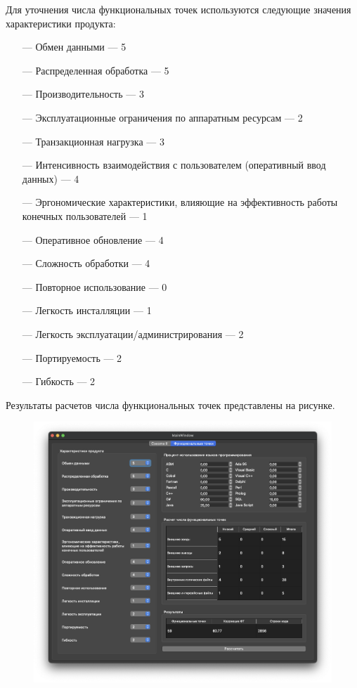 Для уточнения числа функциональных точек используются следующие значения характеристики продукта:

\begin{itemize}
    \item[---] Обмен данными --- 5
    \item[---] Распределенная обработка --- 5
    \item[---] Производительность --- 3
    \item[---] Эксплуатационные ограничения по аппаратным ресурсам --- 2
    \item[---] Транзакционная нагрузка --- 3
    \item[---] Интенсивность взаимодействия с пользователем (оперативный ввод данных) --- 4
    \item[---] Эргономические характеристики, влияющие на эффективность работы конечных пользователей --- 1
    \item[---] Оперативное обновление --- 4
    \item[---] Сложность обработки --- 4
    \item[---] Повторное использование --- 0
    \item[---] Легкость инсталляции --- 1
    \item[---] Легкость эксплуатации/администрирования --- 2
    \item[---] Портируемость --- 2
    \item[---] Гибкость --- 2 
\end{itemize}

Результаты расчетов числа функциональных точек представлены на рисунке.

\begin{figure}[h!]
	\begin{center}
		\includegraphics[scale=0.45]{inc/img/p_2.png}
	\end{center}
	\captionsetup{justification=centering}
	\label{fig:u3}
\end{figure}


